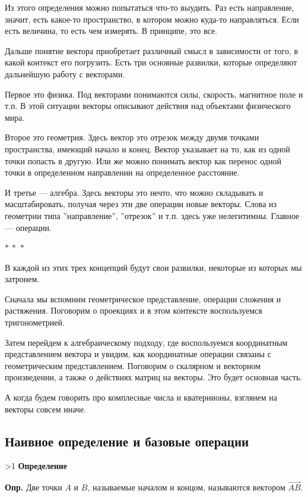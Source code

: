 \documentclass[a4paper,12pt]{article}
\newcommand{\threestars}{\begin{center}$ {\ast}\,{\ast}\,{\ast} $\end{center}}
\newcounter{th-counter}
\newcounter{df-counter}
\newcounter{col-counter}
\newcommand{\df}{\par\noindent\textbf{Опр.} }
\newcounter{subpoint}[subsection]
\renewcommand{\thesubpoint}{\arabic{subpoint}}
\newcommand{\subpoint}[1]{%
  \refstepcounter{subpoint}%
  \ifnum\value{subpoint}>1
    \vspace{1em}%
  \fi
  \noindent\textbf{%
    \fcolorbox{black}{white}{\thesubpoint}\quad #1}%
  \par\vspace{0.5em}%
}
\begin{document}
Из этого определения можно попытаться что-то выудить. Раз есть направление, значит, есть какое-то пространство, в котором можно куда-то направляться. Если есть величина, то есть чем измерять. В принципе, это все.

Дальше понятие вектора приобретает различный смысл в зависимости от того, в какой контекст его погрузить. Есть три основные развилки, которые определяют дальнейшую работу с векторами.

Первое это физика. Под векторами понимаются силы, скорость, магнитное поле и т.п. В этой ситуации векторы описывают действия над объектами физического мира.

Второе это геометрия. Здесь вектор это отрезок между двумя точками пространства, имеющий начало и конец. Вектор указывает на то, как из одной точки попасть в другую. Или же можно понимать вектор как перенос одной точки в определенном направлении на определенное расстояние.

И третье --- алгебра. Здесь векторы это нечто, что можно складывать и масштабировать, получая через эти две операции новые векторы. Слова из геометрии типа ''направление'', ''отрезок'' и т.п. здесь уже нелегитимны. Главное --- операции.

\threestars

В каждой из этих трех концепций будут свои развилки, некоторые из которых мы затронем.

Сначала мы вспомним геометрическое представление, операции сложения и растяжения. Поговорим о проекциях и в этом контексте воспользуемся тригонометрией.

Затем перейдем к алгебраическому подходу, где воспользуемся координатным представлением вектора и увидим, как координатные операции связаны с геометрическим представлением. Поговорим о скалярном и векторном произведении, а также о действиях матриц на векторы. Это будет основная часть.

А когда будем говорить про комплесные числа и кватернионы, взглянем на векторы совсем иначе.

\subsection*{Наивное определение и базовые операции}

\subpoint{Определение}

\df Две точки $A$ и $B$, называемые началом и концом, называются вектором $\overrightarrow{AB}$.
\end{document}
